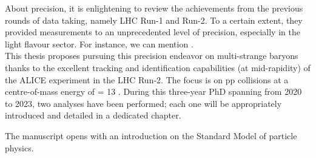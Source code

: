 About precision, it is enlightening to review the achievements from the previous rounds of data taking, namely LHC Run-1 and Run-2. To a certain extent, they provided measurements to an unprecedented level of precision, especially in the light flavour sector. For instance, we can mention .\\

This thesis proposes pursuing this precision endeavor on multi-strange baryons thanks to the excellent tracking and identification capabilities (at mid-rapidity) of the ALICE experiment in the LHC Run-2. The focus is on pp collisions at a centre-of-mass energy of \sqrtS = 13 \tev. During this three-year PhD spanning from 2020 to 2023, two analyses have been performed; each one will be appropriately introduced and detailed in a dedicated chapter.

The manuscript opens with an introduction on the Standard Model of particle physics.


